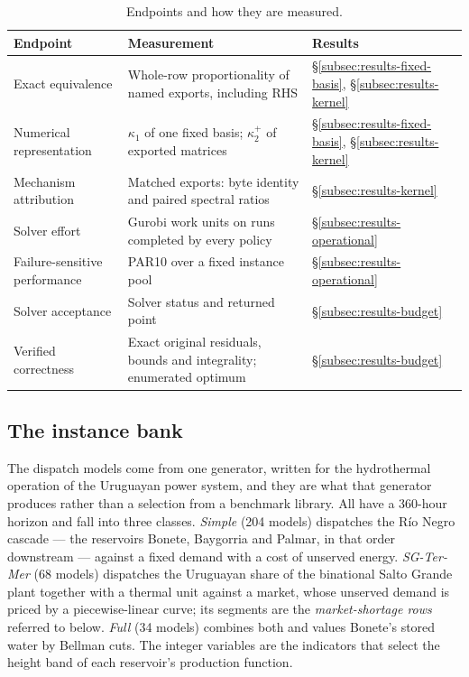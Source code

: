 \documentclass[11pt]{article}
\theoremstyle{definition}
\theoremstyle{remark}
\begin{document}
\begin{table}[tb]
\centering\small
\caption{Endpoints and how they are measured.}\label{tab:endpoints}
\begin{tabularx}{\linewidth}{lXl}
\toprule
Endpoint & Measurement & Results\\
\midrule
Exact equivalence & Whole-row proportionality of named exports, including RHS & \S\ref{subsec:results-fixed-basis}, \S\ref{subsec:results-kernel}\\
Numerical representation & $\kappa_1$ of one fixed basis; $\kappa_2^+$ of exported matrices & \S\ref{subsec:results-fixed-basis}, \S\ref{subsec:results-kernel}\\
Mechanism attribution & Matched exports: byte identity and paired spectral ratios & \S\ref{subsec:results-kernel}\\
Solver effort & Gurobi work units on runs completed by every policy & \S\ref{subsec:results-operational}\\
Failure-sensitive performance & PAR10 over a fixed instance pool & \S\ref{subsec:results-operational}\\
Solver acceptance & Solver status and returned point & \S\ref{subsec:results-budget}\\
Verified correctness & Exact original residuals, bounds and integrality; enumerated optimum & \S\ref{subsec:results-budget}\\
\bottomrule
\end{tabularx}
\end{table}

\subsection{The instance bank}
\label{subsec:design-bank}
The dispatch models come from one generator, written for the hydrothermal operation of the
Uruguayan power system, and they are what that generator produces rather than a selection from
a benchmark library. All have a 360-hour horizon and fall into three classes. \emph{Simple}
(204 models) dispatches the R\'io Negro cascade --- the reservoirs Bonete, Baygorria and
Palmar, in that order downstream --- against a fixed demand with a cost of unserved energy.
\emph{SG-Ter-Mer} (68 models) dispatches the Uruguayan share of the binational Salto Grande
plant together with a thermal unit against a market, whose unserved demand is priced by a
piecewise-linear curve; its segments are the \emph{market-shortage rows} referred to below.
\emph{Full} (34 models) combines both and values Bonete's stored water by Bellman cuts. The
integer variables are the indicators that select the height band of each reservoir's production
function.
\end{document}

